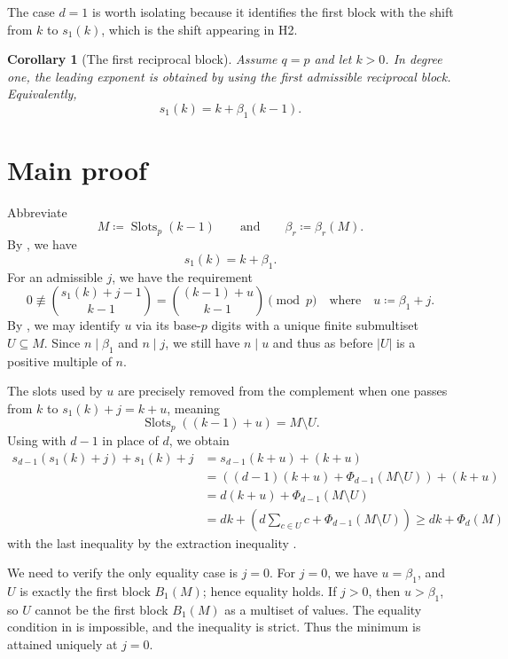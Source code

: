\documentclass[11pt]{amsart}
\newtheorem{corollary}[theorem]{Corollary}
\theoremstyle{definition}
\DeclareMathOperator{\Slots}{Slots}
\begin{document}
The case $d=1$ is worth isolating because it identifies the first block with the shift from $k$ to $s_1(k)$,
which is the shift appearing in H2.

\begin{corollary}[The first reciprocal block]\label{cor:H2-s1}
Assume $q=p$ and let $k>0$.  In degree one,
the leading exponent is obtained by using the first admissible reciprocal block.  Equivalently,
\[
  s_1(k)=k+\beta_1(k-1).
\]
\end{corollary}

\section{Main proof}
Abbreviate
\[
  M \coloneq \Slots_p(k-1) \qquad{\text{and}}\qquad \beta_r \coloneq \beta_r(M).
\]
By , we have
\[
  s_1(k)=k+\beta_1.
\]
For an admissible $j$, we have the requirement
\[ 0 \not\equiv \binom{s_1(k)+j-1}{k-1} = \binom{(k-1)+u}{k-1} \pmod p
  \quad\text{where} \quad u \coloneq \beta_1+j.  \]
By ,
we may identify $u$ via its base-$p$ digits
with a unique finite submultiset $U \subseteq M$.
Since $n \mid \beta_1$ and $n \mid j$, we still have $n \mid u$ and thus as before $|U|$
is a positive multiple of $n$.

The slots used by $u$ are precisely removed from the complement
when one passes from $k$ to $s_1(k)+j=k+u$, meaning
\[
  \Slots_p((k-1)+u) = M \setminus U.
\]
Using  with $d-1$ in place of $d$, we obtain
\begin{align*}
  s_{d-1}(s_1(k)+j)+s_1(k)+j
  &= s_{d-1}(k+u) + (k+u) \\
  &= \left( (d-1)(k+u) + \Phi_{d-1}(M \setminus U) \right) + (k+u) \\
  &= d(k+u)+\Phi_{d-1}(M\setminus U)\\
  &= dk+\left(d\sum_{c\in U}c+\Phi_{d-1}(M\setminus U)\right)
  \ge dk + \Phi_d(M)
\end{align*}
with the last inequality by the extraction inequality .

We need to verify the only equality case is $j = 0$.
For $j=0$, we have $u=\beta_1$, and $U$ is exactly the first block $B_1(M)$; hence equality holds.
If $j>0$, then $u>\beta_1$, so $U$ cannot be the first block $B_1(M)$ as a multiset of values.
The equality condition in  is impossible, and the inequality is strict.
Thus the minimum is attained uniquely at $j=0$.
\end{document}
